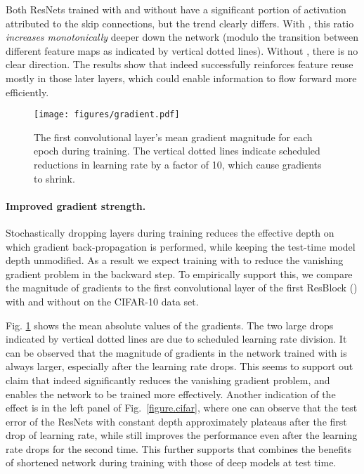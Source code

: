 \documentclass[runningheads]{llncs}
\begin{document}
{Both ResNets trained with and without \name{} have a significant portion of activation attributed to the skip connections, but the trend clearly differs.
With \name{}, this ratio \emph{increases monotonically} deeper down the network (modulo the transition between different feature maps as indicated by vertical dotted lines). Without \name{}, there is no clear direction. The results show that \name{} indeed successfully reinforces feature reuse mostly in those later layers, which could enable information to flow forward more efficiently.
}

\begin{figure}[t]
	\vspace{-2ex}
	\begin{center}
		\centerline{\texttt{[image: figures/gradient.pdf]}}
		\vspace{-2ex}
		\caption{The first convolutional layer's mean gradient magnitude for each epoch during training. The vertical dotted lines indicate scheduled reductions in learning rate by a factor of 10, which cause gradients to shrink.}
		\label{figure.gradient}
	\end{center}
	\vspace{-8ex}
\end{figure}

\paragraph{\textbf{Improved gradient strength.}}
Stochastically dropping layers during training reduces the effective depth on which gradient back-propagation is performed, while keeping the test-time model depth unmodified. As a result we expect training with \name{} to reduce the vanishing gradient problem in the backward step.
To empirically support this, we compare the magnitude of gradients to the first convolutional layer of the first ResBlock () with and without \name{} on the  CIFAR-10 data set.

Fig. \ref{figure.gradient} shows the mean absolute values of the gradients. The two large drops indicated by vertical dotted lines are due to scheduled learning rate division. It can be observed that the magnitude of gradients in the network trained with \name{} is always larger, especially after the learning rate drops. This seems to support out claim that \name{} indeed significantly reduces the vanishing gradient problem, and enables the network to be trained more effectively.  Another indication of the effect is in the left panel of Fig.~\ref{figure.cifar}, where one can observe that the test error of the ResNets with constant depth approximately plateaus after the first drop of learning rate, while \name{} still improves the performance even after the learning rate drops for the second time. This further supports that \name{} combines the benefits of shortened network during training with those of deep models at test time.
\end{document}
